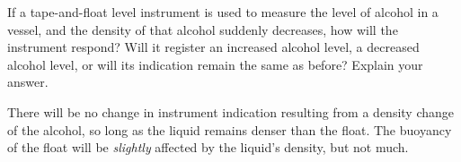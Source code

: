 

If a tape-and-float level instrument is used to measure the level of alcohol in a vessel, and the density of that alcohol suddenly decreases, how will the instrument respond?  Will it register an increased alcohol level, a decreased alcohol level, or will its indication remain the same as before?  Explain your answer.







There will be no change in instrument indication resulting from a density change of the alcohol, so long as the liquid remains denser than the float.  The buoyancy of the float will be {\it slightly} affected by the liquid's density, but not much.











